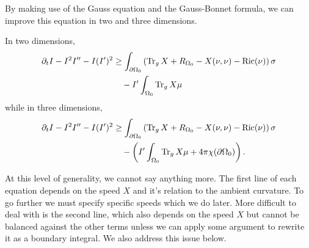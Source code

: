 \documentclass{amsart}
\begin{document}
By making use of the Gauss equation and the Gauss-Bonnet formula, we can improve this equation in two and three dimensions.

\begin{cor}
In two dimensions,
\[
\begin{split}
\partial_t I - I^2 I'' - I(I')^2 &\geq \int_{\partial {\Omega_0}} \left(\operatorname{Tr}_g X + R_{\Omega_0} - X(\nu, \nu) - \operatorname{Ric}(\nu)\right)\sigma \\
&\quad - I'\int_{\Omega_0} \operatorname{Tr}_g X \mu
\end{split}
\]
while in three dimensions,
\[
\begin{split}
\partial_t I - I^2 I'' - I(I')^2 &\geq \int_{\partial {\Omega_0}} \left(\operatorname{Tr}_g X + R_{\Omega_0} - X(\nu, \nu) - \operatorname{Ric}(\nu)\right)\sigma \\
&\quad - \left(I'\int_{\Omega_0} \operatorname{Tr}_g X \mu +  4\pi \chi(\partial {\Omega_0})\right).
\end{split}
\]
\end{cor}

\begin{rem}
At this level of generality, we cannot say anything more. The first line of each equation depends on the speed \(X\) and it's relation to the ambient curvature. To go further we must specify specific speeds which we do later. More difficult to deal with is the second line, which also depends on the speed \(X\) but cannot be balanced against the other terms unless we can apply some argument to rewrite it as a boundary integral. We also address this issue below.
\end{rem}
\end{document}
